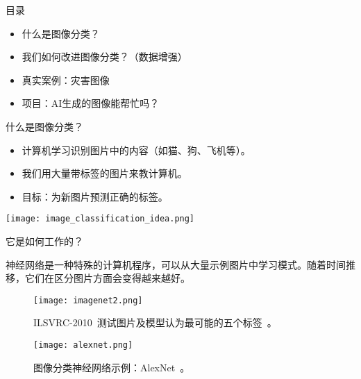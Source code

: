 
\begin{frame}{目录}
  \begin{itemize}
    \item 什么是图像分类？
    \item 我们如何改进图像分类？（数据增强）
    \item 真实案例：灾害图像
    \item 项目：AI生成的图像能帮忙吗？
  \end{itemize}
\end{frame}



\begin{frame}{什么是图像分类？}
  \begin{itemize}
    \item 计算机学习识别图片中的内容（如猫、狗、飞机等）。
    \item 我们用大量带标签的图片来教计算机。
    \item 目标：为新图片预测正确的标签。
  \end{itemize}
  \centering
  \texttt{[image: image\_classification\_idea.png]}
\end{frame}

\begin{refsection}
  \begin{frame}{它是如何工作的？}
    \begin{flushleft}
    神经网络是一种特殊的计算机程序，可以从大量示例图片中学习模式。随着时间推移，它们在区分图片方面会变得越来越好。
    \end{flushleft}
    \begin{figure}
      \begin{minipage}{0.48\linewidth}
        \centering
        \texttt{[image: imagenet2.png]}
        \caption[]{\scriptsize ILSVRC-2010~\parencite{imagenet2010challenge}测试图片及模型认为最可能的五个标签~\parencite{krizhevskyImageNetClassificationDeep2012}。}
      \end{minipage}%
      \hfill
      \begin{minipage}{0.48\linewidth}
        \centering
        \texttt{[image: alexnet.png]}
        \caption[]{\scriptsize 图像分类神经网络示例：AlexNet~\parencite{krizhevskyImageNetClassificationDeep2012}。}
      \end{minipage}
    \end{figure}
    \bottomleftrefs
  \end{frame}
  \end{refsection}



